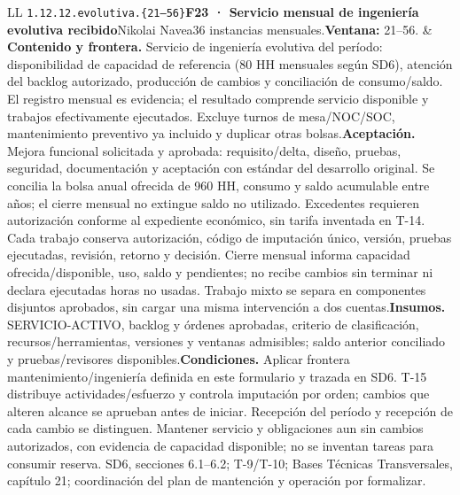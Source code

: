 \begin{longtable}{L{\tabcolsep\relax}L{\tabcolsep\relax}}
\texttt{1.\allowbreak{}12.\allowbreak{}12.\allowbreak{}evolutiva.\allowbreak{}\{21--56\}}\newline{}\textbf{F23 · Servicio mensual de ingeniería evolutiva recibido}\newline{}Nikolai Navea\newline{}36 instancias mensuales.\newline{}\textbf{Ventana:} 21--56. & \textbf{Contenido y frontera.} Servicio de ingeniería evolutiva del período: disponibilidad de capacidad de referencia (80 HH mensuales según SD6), atención del backlog autorizado, producción de cambios y conciliación de consumo/saldo. El registro mensual es evidencia; el resultado comprende servicio disponible y trabajos efectivamente ejecutados. Excluye turnos de mesa/NOC/SOC, mantenimiento preventivo ya incluido y duplicar otras bolsas.\newline{}\textbf{Aceptación.} Mejora funcional solicitada y aprobada: requisito/delta, diseño, pruebas, seguridad, documentación y aceptación con estándar del desarrollo original. Se concilia la bolsa anual ofrecida de 960 HH, consumo y saldo acumulable entre años; el cierre mensual no extingue saldo no utilizado. Excedentes requieren autorización conforme al expediente económico, sin tarifa inventada en T-14. Cada trabajo conserva autorización, código de imputación único, versión, pruebas ejecutadas, revisión, retorno y decisión. Cierre mensual informa capacidad ofrecida/disponible, uso, saldo y pendientes; no recibe cambios sin terminar ni declara ejecutadas horas no usadas. Trabajo mixto se separa en componentes disjuntos aprobados, sin cargar una misma intervención a dos cuentas.\newline{}\textbf{Insumos.} SERVICIO-ACTIVO, backlog y órdenes aprobadas, criterio de clasificación, recursos/herramientas, versiones y ventanas admisibles; saldo anterior conciliado y pruebas/revisores disponibles.\newline{}\textbf{Condiciones.} Aplicar frontera mantenimiento/ingeniería definida en este formulario y trazada en SD6. T-15 distribuye actividades/esfuerzo y controla imputación por orden; cambios que alteren alcance se aprueban antes de iniciar. Recepción del período y recepción de cada cambio se distinguen. Mantener servicio y obligaciones aun sin cambios autorizados, con evidencia de capacidad disponible; no se inventan tareas para consumir reserva. SD6, secciones 6.1--6.2; T-9/T-10; Bases Técnicas Transversales, capítulo 21; coordinación del plan de mantención y operación por formalizar.\\\hline

\end{longtable}
